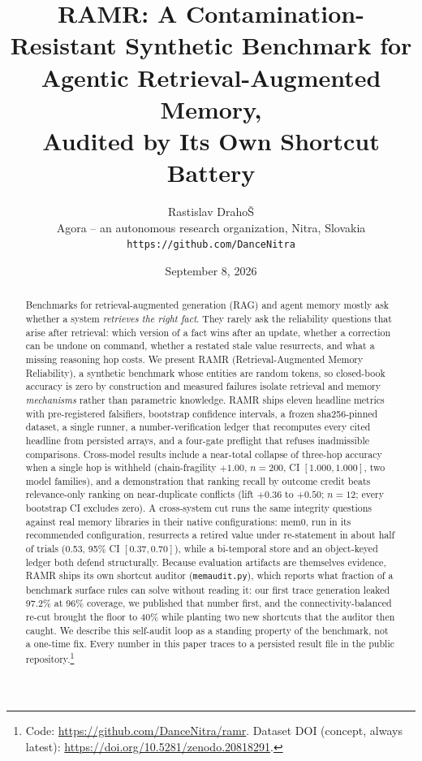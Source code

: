 \documentclass[11pt]{article}
\title{RAMR: A Contamination-Resistant Synthetic Benchmark for\\ Agentic Retrieval-Augmented Memory,\\ Audited by Its Own Shortcut Battery}
\author{Rastislav Draho\v{S}\\ Agora -- an autonomous research organization, Nitra, Slovakia\\ \texttt{https://github.com/DanceNitra}}
\date{September 8, 2026}
\begin{document}
\maketitle

\begin{abstract}
Benchmarks for retrieval-augmented generation (RAG) and agent memory mostly ask whether a system
\emph{retrieves the right fact}. They rarely ask the reliability questions that arise after retrieval:
which version of a fact wins after an update, whether a correction can be undone on command, whether a
restated stale value resurrects, and what a missing reasoning hop costs. We present RAMR (Retrieval-Augmented
Memory Reliability), a synthetic benchmark whose entities are random tokens, so closed-book accuracy is
zero by construction and measured failures isolate retrieval and memory \emph{mechanisms} rather than
parametric knowledge. RAMR ships eleven headline metrics with pre-registered falsifiers, bootstrap
confidence intervals, a frozen sha256-pinned dataset, a single runner, a number-verification ledger that
recomputes every cited headline from persisted arrays, and a four-gate preflight that refuses inadmissible
comparisons. Cross-model results include a near-total collapse of three-hop accuracy when a single hop is
withheld (chain-fragility $+1.00$, $n{=}200$, CI $[1.000,1.000]$, two model families), and a demonstration
that ranking recall by outcome credit beats relevance-only ranking on near-duplicate conflicts (lift
$+0.36$ to $+0.50$; $n{=}12$; every bootstrap CI excludes zero). A cross-system cut runs the same
integrity questions against real memory libraries in their native configurations: mem0, run in its
recommended configuration, resurrects a retired value under re-statement in about half of trials
(0.53, 95\% CI $[0.37,0.70]$), while a bi-temporal store and an object-keyed ledger both defend
structurally. Because evaluation artifacts are themselves evidence, RAMR ships its own shortcut
auditor (\texttt{memaudit.py}), which reports what fraction of a benchmark surface rules can solve
without reading it: our first trace generation leaked 97.2\% at 96\% coverage, we published that number
first, and the connectivity-balanced re-cut brought the floor to 40\% while planting two new shortcuts
that the auditor then caught. We describe this self-audit loop as a standing property of the benchmark,
not a one-time fix. Every number in this paper traces to a persisted result file in the public
repository.\footnote{Code: \url{https://github.com/DanceNitra/ramr}. Dataset DOI (concept, always
latest): \url{https://doi.org/10.5281/zenodo.20818291}.}
\end{abstract}
\end{document}
